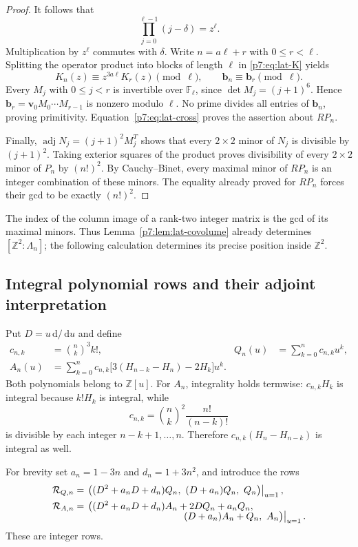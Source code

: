 \documentclass[11pt,a4paper]{article}
\theoremstyle{definition}
\theoremstyle{remark}
\newcommand{\Z}{\mathbb Z}
\newcommand{\dd}{\,\mathrm d}
\numberwithin{equation}{section}
\begin{document}
\begin{proof}
It follows that
\[
\prod_{j=0}^{\ell-1}(j-\delta)=z^\ell.
\]
Multiplication by $z^\ell$ commutes with $\delta$.  Write
$n=a\ell+r$ with $0\leq r<\ell$.  Splitting the operator product into
blocks of length $\ell$ in \eqref{p7:eq:lat-K} yields
\[
K_n(z)\equiv z^{3a\ell}K_r(z)\pmod\ell,
\qquad \mathbf b_n\equiv\mathbf b_r\pmod\ell.
\]
Every $M_j$ with $0\leq j<r$ is invertible over $\mathbb F_\ell$,
since $\det M_j=(j+1)^6$.  Hence
$\mathbf b_r=\mathbf v_0M_0\cdots M_{r-1}$ is nonzero modulo $\ell$.
No prime divides all entries of $\mathbf b_n$, proving primitivity.
Equation~\eqref{p7:eq:lat-cross} proves the assertion about $RP_n$.

Finally, $\operatorname{adj}N_j=(j+1)^2M_j^T$ shows that every
$2\times2$ minor of $N_j$ is divisible by $(j+1)^2$.  Taking exterior
squares of the product proves divisibility of every $2\times2$ minor of
$P_n$ by $(n!)^2$.  By Cauchy--Binet, every maximal minor of $RP_n$ is an
integer combination of these minors.  The equality already proved for
$RP_n$ forces their gcd to be exactly $(n!)^2$.
\end{proof}

The index of the column image of a rank-two integer matrix is the gcd of
its maximal minors.  Thus Lemma~\ref{p7:lem:lat-covolume} already determines
$[\Z^2:\Lambda_n]$; the following calculation determines its precise
position inside $\Z^2$.

\subsection{Integral polynomial rows and their adjoint interpretation}

Put $D=u\dd/\dd u$ and define
\begin{align}
c_{n,k}&=\binom nk^3k!,&
Q_n(u)&=\sum_{k=0}^n c_{n,k}u^k,\label{p7:eq:lat-Q}\\
A_n(u)&=\sum_{k=0}^n c_{n,k}
 \bigl[3(H_{n-k}-H_n)-2H_k\bigr]u^k.\label{p7:eq:lat-A}
\end{align}
Both polynomials belong to $\Z[u]$.  For $A_n$, integrality holds
termwise: $c_{n,k}H_k$ is integral because $k!H_k$ is integral, while
\[
c_{n,k}=\binom nk^2\frac{n!}{(n-k)!}
\]
is divisible by each integer $n-k+1,\ldots,n$.  Therefore
$c_{n,k}(H_n-H_{n-k})$ is integral as well.

For brevity set $a_n=1-3n$ and $d_n=1+3n^2$, and introduce the rows
\begin{align}
\mathcal R_{Q,n}
&=\left.\bigl((D^2+a_nD+d_n)Q_n,\ (D+a_n)Q_n,\ Q_n\bigr)
\right|_{u=1},\label{p7:eq:lat-RQ}\\
\mathcal R_{A,n}
&=\left.\bigl((D^2+a_nD+d_n)A_n+2DQ_n+a_nQ_n,\right.\notag\\[-2mm]
&\hspace{39mm}\left.(D+a_n)A_n+Q_n,\ A_n\bigr)
\right|_{u=1}.\label{p7:eq:lat-RA}
\end{align}
These are integer rows.
\end{document}
